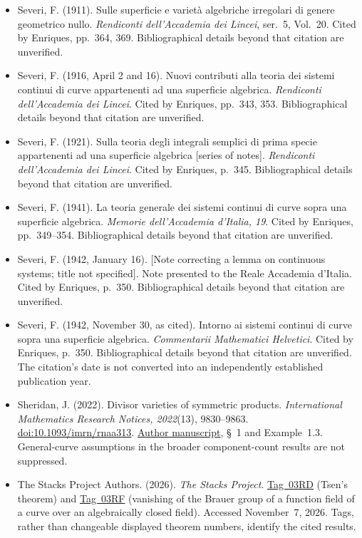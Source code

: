 \begin{sloppypar}
\begin{itemize}
\item Severi, F. (1911). Sulle superficie e varietà algebriche irregolari di genere geometrico nullo. \emph{Rendiconti dell'Accademia dei Lincei}, ser.~5, Vol.~20. Cited by Enriques, pp.~364, 369. Bibliographical details beyond that citation are unverified.

\item Severi, F. (1916, April 2 and 16). Nuovi contributi alla teoria dei sistemi continui di curve appartenenti ad una superficie algebrica. \emph{Rendiconti dell'Accademia dei Lincei}. Cited by Enriques, pp.~343, 353. Bibliographical details beyond that citation are unverified.

\item Severi, F. (1921). Sulla teoria degli integrali semplici di prima specie appartenenti ad una superficie algebrica [series of notes]. \emph{Rendiconti dell'Accademia dei Lincei}. Cited by Enriques, p.~345. Bibliographical details beyond that citation are unverified.

\item Severi, F. (1941). La teoria generale dei sistemi continui di curve sopra una superficie algebrica. \emph{Memorie dell'Accademia d'Italia, 19}. Cited by Enriques, pp.~349--354. Bibliographical details beyond that citation are unverified.

\item Severi, F. (1942, January 16). [Note correcting a lemma on continuous systems; title not specified]. Note presented to the Reale Accademia d'Italia. Cited by Enriques, p.~350. Bibliographical details beyond that citation are unverified.

\item Severi, F. (1942, November 30, as cited). Intorno ai sistemi continui di curve sopra una superficie algebrica. \emph{Commentarii Mathematici Helvetici}. Cited by Enriques, p.~350. Bibliographical details beyond that citation are unverified. The citation's date is not converted into an independently established publication year.

\item Sheridan, J. (2022). Divisor varieties of symmetric products. \emph{International Mathematics Research Notices, 2022}(13), 9830--9863. \href{https://doi.org/10.1093/imrn/rnaa313}{doi:10.1093/imrn/rnaa313}. \href{https://arxiv.org/abs/1906.05465}{Author manuscript}, \S~1 and Example~1.3. General-curve assumptions in the broader component-count results are not suppressed.

\item The Stacks Project Authors. (2026). \emph{The Stacks Project}. \href{https://stacks.math.columbia.edu/tag/03RD}{Tag~03RD} (Tsen's theorem) and \href{https://stacks.math.columbia.edu/tag/03RF}{Tag~03RF} (vanishing of the Brauer group of a function field of a curve over an algebraically closed field). Accessed November~7, 2026. Tags, rather than changeable displayed theorem numbers, identify the cited results.


\end{itemize}
\end{sloppypar}
